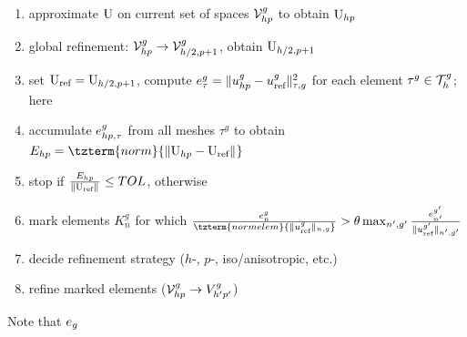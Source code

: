 \begin{enumerate}
	\item approximate $\flfl$ on current set of spaces $\Space_{hp}^g$ to obtain $\flfl_{hp}$
	\item global refinement: $\Space_{hp}^g \to \Space_{h/2,p+1}^g$, obtain $\flfl_{h/2,p+1}$
	\item set $\flfl_{\rf} = \flfl_{h/2,p+1}$, compute $\indic^g_\elem = \norm[\elem,g]{\fl_{hp}^g-\fl^g_{\rf}}^2$ for
	each element $\elem^g \in \mesh^g$; here  
	\item accumulate $\indic_{hp,\elem}^g$ from all meshes $\tau^g$ to obtain
	$E_{hp}=\tzterm{norm}{\norm{\flfl_{hp}-\flfl_{\rf}}}$ ~~
	\item stop if $\frac{E_{hp}}{\norm{\flfl_{\rf}}} \leq TOL$, otherwise
	\item mark elements $K_n^g$ for which $\frac{\indic^g_n}{\tzterm{normelem}{\norm[n,g]{\fl_{\rf}^g}}} > \theta\max_{n',g'}\frac{\indic^{g'}_{n'}}{\norm[n',g']{\fl_{\rf}^{g'}}}$
	\item decide refinement strategy ($h$-, $p$-, iso/anisotropic, etc.)  
	\item refine marked elements ($\Space_{hp}^g \to V_{h'p'}^g$)
\end{enumerate}

Note that $\indic_g$ 